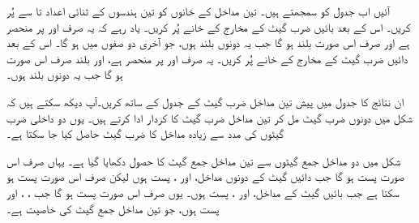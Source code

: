 آئیں اب جدول کو سمجھتے ہیں۔ تین مداخل  کے خانوں کو تین ہندسوں کے ثنائی اعداد  تا  سے پُر کریں۔ اس کے بعد بائیں ضرب گیٹ کے مخارج  کے خانے پُر کریں۔ یاد رہے کہ یہ صرف  اور  پر منحصر ہے اور صرف اس صورت بلند ہو گا جب یہ دونوں بلند ہوں، جو آخری دو صفوں میں ہو گا۔ اس کے بعد دائیں ضرب گیٹ کے مخارج  کے خانے پُر کریں۔ یہ صرف  اور  پر منحصر ہے، اور بلند صرف اس صورت ہو گا جب یہ دونوں بلند ہوں۔

ان نتائج کا جدول  میں پیش تین مداخل ضرب گیٹ کے جدول کے ساتھ کریں۔آپ دیکھ سکتے ہیں کہ شکل  میں دونوں ضرب گیٹ مل کر تین مداخل ضرب گیٹ کا کردار ادا کرتے ہیں۔ یوں دو داخلی ضرب گیٹوں کی مدد سے زیادہ مداخل کا ضرب گیٹ حاصل کیا جا سکتا ہے۔

 شکل  میں دو مداخل جمع گیٹوں سے تین مداخل جمع گیٹ کا حصول دکھایا گیا ہے۔ یہاں  صرف اس صورت پست ہو گا جب دائیں گیٹ کے دونوں مداخل،  اور ، پست ہوں لیکن  صرف اس صورت پست ہو سکتا ہے جب بائیں گیٹ کے مداخل،  اور ، پست ہوں۔ یوں  صرف اس صورت پست ہو گا جب ، ، اور  پست ہوں، جو تین مداخل جمع گیٹ کی خاصیت ہے۔

